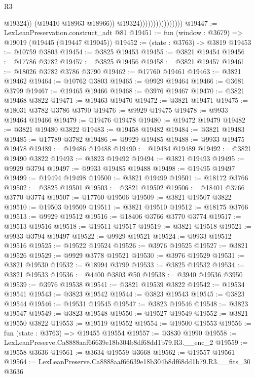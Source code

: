 \begin{lexlean}{R3}
\begin{coremodule}
                                          @19324))
                                      (@19410 @18963 @18966))
                                    @19324))))))))))))))))
@19447 := LexLeanPreservation.construct_adt @81
@19451 := fun (window : @3679) => @19019 (@19445 (@19447 @19045))
@19452 := (state : @3763) -> @3819
@19453 := @10759 @3803
@19454 := @3825 @19453
@19455 := @3821 @19454
@19456 := @17786 @3782
@19457 := @3825 @19456
@19458 := @3821 @19457
@19461 := @18026 @3782 @3786 @3790
@19462 := @17760 @19461
@19463 := @3821 @19462
@19464 := @10762 @3803
@19465 := @9929 @19464
@19466 := @3681 @3799
@19467 := @19465 @19466
@19468 := @3976 @19467
@19470 := @3821 @19468 @3822
@19471 := @19463 @19470
@19472 := @3821 @19471
@19475 := @18031 @3782 @3786 @3790
@19476 := @9929 @19475
@19478 := @9933 @19464 @19466
@19479 := @19476 @19478
@19480 := @19472 @19479
@19482 := @3821 @19480 @3822
@19483 := @19458 @19482
@19484 := @3821 @19483
@19485 := @17789 @3782
@19486 := @9929 @19485
@19488 := @9933 @19475 @19478
@19489 := @19486 @19488
@19490 := @19484 @19489
@19492 := @3821 @19490 @3822
@19493 := @3823 @19492
@19494 := @3821 @19493
@19495 := @9929 @3794
@19497 := @9933 @19485 @19488
@19498 := @19495 @19497
@19499 := @19494 @19498
@19500 := @3821 @19499
@19501 := @18172 @3766
@19502 := @3825 @19501
@19503 := @3821 @19502
@19506 := @18401 @3766 @3770 @3774
@19507 := @17760 @19506
@19509 := @3821 @19507 @3822
@19510 := @19503 @19509
@19511 := @3821 @19510
@19512 := @18175 @3766
@19513 := @9929 @19512
@19516 := @18406 @3766 @3770 @3774
@19517 := @19513 @19516
@19518 := @19511 @19517
@19519 := @3821 @19518
@19521 := @9933 @3794 @19497
@19522 := @9929 @19521
@19524 := @9933 @19512 @19516
@19525 := @19522 @19524
@19526 := @3976 @19525
@19527 := @3821 @19526
@19529 := @9929 @3778 @19521
@19530 := @3976 @19529
@19531 := @3821 @19530
@19532 := @18994 @3799
@19533 := @3825 @19532
@19534 := @3821 @19533
@19536 := @4400 @3803 @50
@19538 := @3940 @19536 @3950
@19539 := @3976 @19538
@19541 := @3821 @19539 @3822
@19542 := @19534 @19541
@19543 := @3823 @19542
@19544 := @3823 @19543
@19545 := @3823 @19544
@19546 := @19531 @19545
@19547 := @3823 @19546
@19548 := @3823 @19547
@19549 := @3823 @19548
@19550 := @19527 @19549
@19552 := @3821 @19550 @3822
@19553 := @19519 @19552
@19554 := @19500 @19553
@19556 := fun (state : @3763) => @19455 @19554
@19557 := @3830 @1990
@19558 := LexLeanPreserve.Ca8888aaf66639e18b304b8df68dd1b79.R3.__enc_2
@19559 := @19558 @3636
@19561 := @3634 @19559 @3668
@19562 := @19557 @19561
@19564 := LexLeanPreserve.Ca8888aaf66639e18b304b8df68dd1b79.R3.__fits_30 @3636

\end{coremodule}
\end{lexlean}

